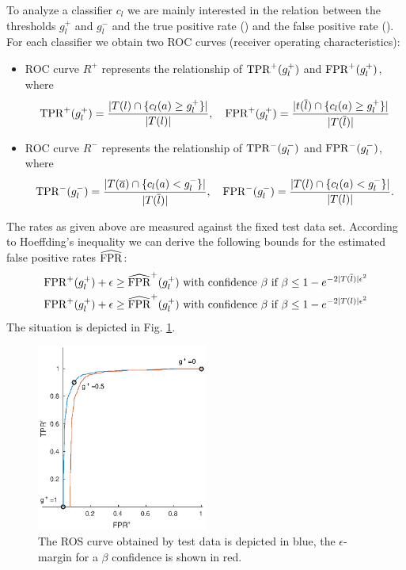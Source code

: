 To analyze a classifier $c_l$ we are mainly interested in the relation between the thresholds $g_l^+$ and $g_l^-$ and the true positive rate (\TPR) and the false positive rate (\FPR). For each classifier we obtain two ROC curves (receiver operating characteristics):
\begin{itemize}
\item ROC curve $R^+$ represents the relationship of $\mathrm{TPR}^+(g_l^+)$ and $\mathrm{FPR}^+(g_l^+)$,
where
\begin{gather*}
    \mathrm{TPR}^+(g_l^+) = \frac{ | T(l) \cap \{ c_l(a) \geq g_l^+ \}|}{|T(l)|},\quad
    \mathrm{FPR}^+(g_l^+) = \frac{ | t(\overline l) \cap \{ c_l(a) \geq g_l^+ \}|}{|T(\overline l)|}
\end{gather*}
\item ROC curve $R^-$ represents the relationship of $\mathrm{TPR}^-(g_l^-)$ and $\mathrm{FPR}^-(g_l^-)$, where
\begin{gather*}
    \mathrm{TPR}^-(g_l^-) = \frac{ | T(\overline a) \cap \{c_l(a) < g_l^- \}|}{|T(\overline l)|},\quad
    \mathrm{FPR}^-(g_l^-) = \frac{ | T(l) \cap \{c_l(a) < g_l^- \}|}{|T(l)|}.
\end{gather*}
\end{itemize}
The rates as given above are measured against the fixed test data set.
According to Hoeffding's inequality we can derive the following bounds for the estimated false positive rates $\widehat{\mathrm{FPR}}$:
\begin{gather*}
    \mathrm{FPR}^+(g_l^+) + \epsilon \geq \widehat{\mathrm{FPR}}^+(g_l^+) \text{ with confidence $\beta$ if } \beta \leq 1 - e^{-2|T(\overline l)|\epsilon^2}\\
    \mathrm{FPR}^+(g_l^+) + \epsilon \geq \widehat{\mathrm{FPR}}^+(g_l^+) \text{ with confidence $\beta$ if } \beta \leq 1 - e^{-2|T(l)|\epsilon^2}
\end{gather*}
The situation is depicted in Fig. \ref{fig:ros}.
\begin{figure}
    \centering
    \includegraphics[width=0.5\textwidth]{ros}
    \caption{The ROS curve obtained by test data is depicted in blue, the $\epsilon$-margin for a $\beta$ confidence is shown in red.}
    \label{fig:ros}
\end{figure}

